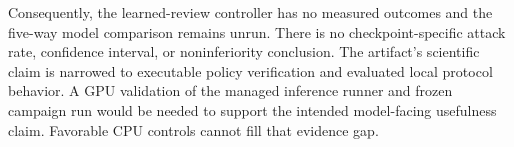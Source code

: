Consequently, the learned-review controller has no measured outcomes and the
five-way model comparison remains unrun. There is no checkpoint-specific
attack rate, confidence interval, or noninferiority conclusion. The artifact's
scientific claim is narrowed to executable policy verification and evaluated
local protocol behavior. A GPU validation of the managed inference runner and frozen
campaign run would be needed to support the intended model-facing usefulness
claim. Favorable CPU controls cannot fill that evidence gap.
